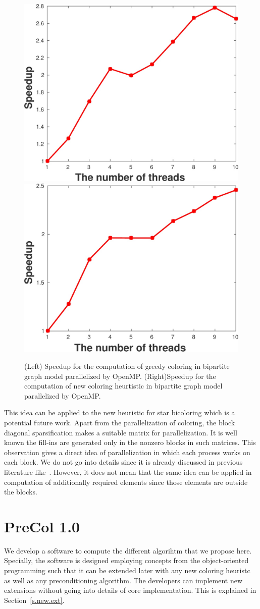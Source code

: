\documentclass[11pt, twoside,a4paper]{book}
\newcommand{\secref}[1]{Section~\protect\ref{#1}}
\begin{document}
\begin{figure}
\includegraphics[width=0.44\linewidth]{ths_spd.jpg}\hfill
\includegraphics[width=0.47\linewidth]{ths_spd2.jpg}
\caption{
(Left) Speedup for the computation of greedy coloring in bipartite graph model parallelized by OpenMP.
(Right)Speedup for the computation of new coloring heurtistic in bipartite graph model parallelized by OpenMP.
}
\label{speedups}
\end{figure}

This idea can be applied to the new heuristic for star bicoloring which is a potential future work.
Apart from the parallelization of coloring, the block diagonal sparsification makes a suitable
matrix for parallelization. It is well known the fill-ins are generated only in the nonzero blocks in such matrices. This observation gives a direct idea of parallelization in which each process
works on each block. We do not go into details since it is already discussed in previous literature like~\cite{parblockilu}. However, it does not mean that the same idea can be applied in computation of
additionally required elements since those elements are outside the blocks.

\section{PreCol 1.0}
\label{s.extend}
We develop a software to compute the different algorihtm that we propose here.
Specially, the software is designed employing concepts from the object-oriented programming
such that it can be extended later with any new coloring heuristc as well as any preconditioning algorithm.
The developers can implement new extensions without going into details of core implementation.
This is explained in \secref{s.new.ext}.
\end{document}
